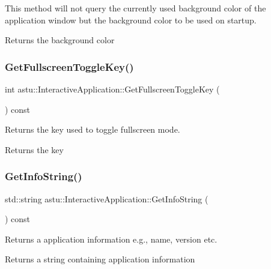 This method will not query the currently used background color of the application window but the background color to be used on startup.

\begin{DoxyReturn}{Returns}
the background color 
\end{DoxyReturn}
\mbox{\label{classastu_1_1InteractiveApplication_a1e9a970c88bd969f567b4e02516ebbb2}} 
\subsubsection{\texorpdfstring{Get\+Fullscreen\+Toggle\+Key()}{GetFullscreenToggleKey()}}
{\footnotesize\ttfamily int astu\+::\+Interactive\+Application\+::\+Get\+Fullscreen\+Toggle\+Key (\begin{DoxyParamCaption}{ }\end{DoxyParamCaption}) const}

Returns the key used to toggle fullscreen mode.

\begin{DoxyReturn}{Returns}
the key 
\end{DoxyReturn}
\mbox{\label{classastu_1_1InteractiveApplication_aaee25e4b315394764152eeb1ae570f06}} 
\subsubsection{\texorpdfstring{Get\+Info\+String()}{GetInfoString()}}
{\footnotesize\ttfamily std\+::string astu\+::\+Interactive\+Application\+::\+Get\+Info\+String (\begin{DoxyParamCaption}{ }\end{DoxyParamCaption}) const}

Returns a application information e.\+g., name, version etc.

\begin{DoxyReturn}{Returns}
a string containing application information 
\end{DoxyReturn}
\mbox{\label{classastu_1_1InteractiveApplication_a9fcba2d4fde1fc0e5f7640bcccb19ea0}} 
